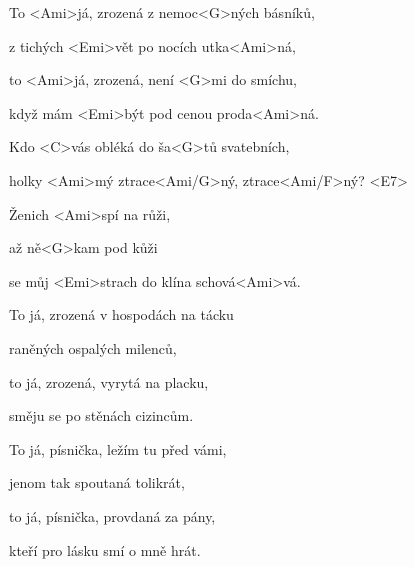 

\zs
To <Ami>já, zrozená z nemoc<G>ných básníků,

z tichých <Emi>vět po nocích utka<Ami>ná,

to <Ami>já, zrozená, není <G>mi do smíchu,

když mám <Emi>být pod cenou proda<Ami>ná.
\ks

\zr
Kdo <C>vás obléká do ša<G>tů svatebních,

holky <Ami>mý ztrace<Ami/G>ný, ztrace<Ami/F>ný? <E7> 

Ženich <Ami>spí na růži,

až ně<G>kam pod kůži 

se můj <Emi>strach do klína schová<Ami>vá.
\kr

\zs
To já, zrozená v hospodách na tácku

raněných ospalých milenců,

to já, zrozená, vyrytá na placku,

směju se po stěnách cizincům.
\ks

\zr	\kr

\zs
To já, písnička, ležím tu před vámi,

jenom tak spoutaná tolikrát,

to já, písnička, provdaná za pány,

kteří pro lásku smí o mně hrát.
\ks

\zr	\kr
\kp







